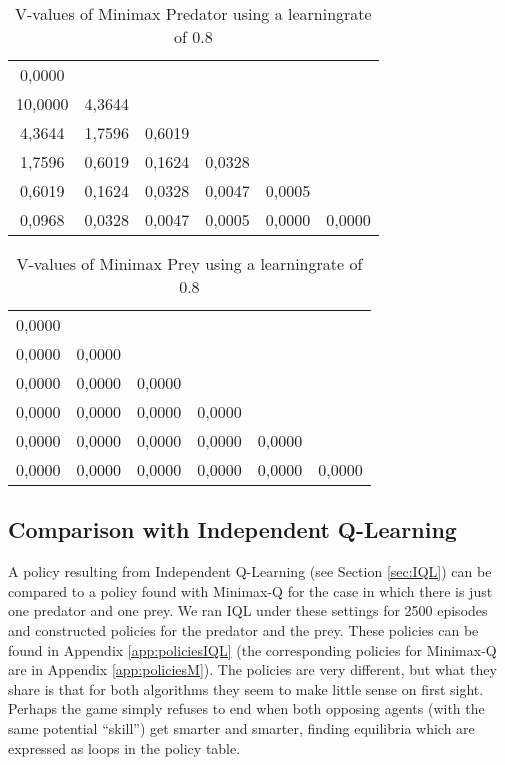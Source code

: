 \begin{table}[htb]
\centering
\begin{tabular}{cccccc}
0,0000 &  &  &  &  & \\
10,0000 & 4,3644 &  &  &  & \\ 
4,3644 & 1,7596 & 0,6019 &  &  & \\
1,7596 & 0,6019 & 0,1624 & 0,0328 &  & \\ 
0,6019 & 0,1624 & 0,0328 & 0,0047 & 0,0005 & \\ 
0,0968 & 0,0328 & 0,0047 & 0,0005 & 0,0000 & 0,0000\\ 
\end{tabular}
\caption{V-values of Minimax Predator using a learningrate of 0.8}
\label{tab:predM}
\end{table}

\begin{table}[htb]
\centering
\begin{tabular}{cccccc}
0,0000 &  &  &  &  & \\ 
0,0000 & 0,0000 &  &  &  & \\ 
0,0000 & 0,0000 & 0,0000 &  &  & \\ 
0,0000 & 0,0000 & 0,0000 & 0,0000 &  & \\ 
0,0000 & 0,0000 & 0,0000 & 0,0000 & 0,0000 & \\ 
0,0000 & 0,0000 & 0,0000 & 0,0000 & 0,0000 & 0,0000\\ 
\end{tabular}
\caption{V-values of Minimax Prey using a learningrate of 0.8}
\label{tab:preyM}
\end{table}

\FloatBarrier

\subsection{Comparison with Independent Q-Learning}\label{sec:comparisonIQLandMinimax}

A policy resulting from Independent Q-Learning (see Section \ref{sec:IQL}) can be compared to a policy found with Minimax-Q for the case in which there is just one predator and one prey. We ran IQL under these settings for 2500 episodes and constructed policies for the predator and the prey. These policies can be found in Appendix \ref{app:policiesIQL} (the corresponding policies for Minimax-Q are in Appendix \ref{app:policiesM}). The policies are very different, but what they share is that for both algorithms they seem to make little sense on first sight. Perhaps the game simply refuses to end when both opposing agents (with the same potential ``skill'') get smarter and smarter, finding equilibria which are expressed as loops in the policy table.